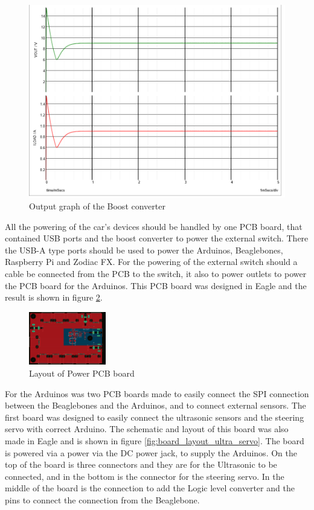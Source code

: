 \documentclass[11pt, titlepage]{article} %
\begin{document}
\begin{figure}
	\centering
	\includegraphics{graph_of_boost_out.png}
	\caption{Output graph of the Boost converter}
	\label{fig:graph_boost}
\end{figure}

All the powering of the car's devices should be handled by one PCB board, that contained USB ports and the boost converter to power the external switch. There the USB-A type ports should be used to power the Arduinos, Beaglebones, Raspberry Pi and Zodiac FX. For the powering of the external switch should a cable be connected from the PCB to the switch, it also to power outlets to power the PCB board for the Arduinos. This PCB board was designed in Eagle and the result is shown in figure \ref{fig:power_pcb_layout}. 

\begin{figure}
	\centering
	\includegraphics[width=0.3\textwidth]{power_board_layout.png}
	\caption{Layout of Power PCB board}
    \label{fig:power_pcb_layout}
\end{figure}

For the Arduinos was two PCB boards made to easily connect the SPI connection between the Beaglebones and the Arduinos, and to connect external sensors. The first board was designed to easily connect the ultrasonic sensors and the steering servo with correct Arduino. The schematic and layout of this board was also made in Eagle and is shown in figure \ref{fig:board_layout_ultra_servo}. The board is powered via a power via the DC power jack, to supply the Arduinos. On the top of the board is three connectors and they are for the Ultrasonic to be connected, and in the bottom is the connector for the steering servo. In the middle of the board is the connection to add the Logic level converter and the pins to connect the connection from the Beaglebone. 
\end{document}
